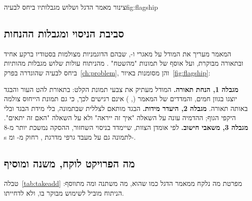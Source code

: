 \begin{reportfigure}{צינור מאמר הדגל  ושלוש מגבלותיו ביחס לבעיה}{fig:flagship}
\end{reportfigure}

\subsection{סביבת הניסוי ומגבלות ההנחות}
המאמר מעריך את המודל על מאגרי  ו-, שבהם הדוגמניות מצולמות בסטודיו ברקע אחיד ובתאורה מבוקרת, ועל אוסף של תמונות "מהשטח" \cite{choi2024idmvton}. מהניתוח עולות שלוש מגבלות מהותיות ביחס לבעיה שהוגדרה בפרק~\ref{ch:problem}, והן מסומנות באיור~\ref{fig:flagship}:

\textbf{מגבלה \num{1}, הנחת תאורה.} המודל מעתיק את צבעי תמונת הקלט: בתאורת להט העור והבגד יוצגו בגוון חמים, והמדדים של המאמר (, ) אינם רגישים לכך, כי גם תמונת הייחוס צולמה באותה תאורה. \textbf{מגבלה \num{2}, היעדר מידות.} הבגד מותאם לצללית שבתמונה, בלי מידת הבגד ובלי היקפי הגוף; ההדמיה עונה על השאלה "איך זה ייראה" ולא על השאלה "האם זה יתאים". \textbf{מגבלה \num{3}, משאבי חישוב.} לפי אומדן הצוות, שיימדד בניסוי השחזור, ההסקה נמשכת יותר מ-\num{8 s} לתמונה גם על מעבד גרפי מדרגת , רחוק מ- ומ-.

\subsection{מה הפרויקט לוקח, משנה ומוסיף}
טבלה~\ref{tab:takeadd} מפרטת מה נלקח ממאמר הדגל כמו שהוא, מה משתנה ומה מתווסף: הניתוח מוביל לשימוש מבוקר בו, ולא לדחייתו.

